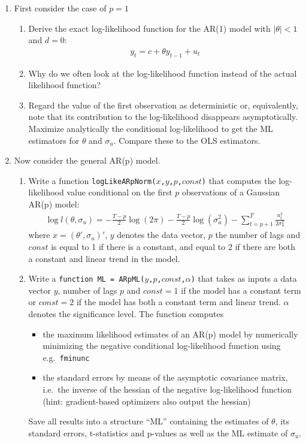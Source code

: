 \begin{enumerate}
\item
First consider the case of \(p=1\)
\begin{enumerate}
  \item Derive the exact log-likelihood function for the AR{(1)} model with \(|\theta|<1\) and \(d=0\):
  \begin{align*}
  y_t = c + \theta y_{t-1} + u_t
  \end{align*}
  \item Why do we often look at the log-likelihood function instead of the actual likelihood function?
  \item Regard the value of the first observation as deterministic or, equivalently,
    note that its contribution to the log-likelihood disappears asymptotically.
    Maximize analytically the conditional log-likelihood to get the ML estimators for \(\theta \) and \(\sigma_u\).
    Compare these to the OLS estimators.
\end{enumerate}
\item
Now consider the general AR{(p)} model.
\begin{enumerate}
  \item Write a function \texttt{logLikeARpNorm{(\(x\),\(y\),\(p\),\(const\))}}
    that computes the log-likelihood value
    conditional on the first \(p\) observations of a Gaussian AR{(p)} model:
  \begin{align*}
  \log l(\theta,\sigma_u)= -\frac{T-p}{2}\log(2\pi)-\frac{T-p}{2}\log(\sigma_u^2)-\sum_{t=p+1}^{T}\frac{u_t^2}{2\sigma_u^2}
  \end{align*}
  where \(x=(\theta',\sigma_u)'\), \(y\) denotes the data vector,
  \(p\) the number of lags and \(const\) is equal to 1 if there is a constant,
  and equal to 2 if there are both a constant and linear trend in the model.
  \item Write a \texttt{function ML = ARpML{(\(y\),\(p\),\(const\),\( \alpha \))}}
    that takes as inputs a data vector \(y\), number of lags \(p\)
    and \(const=1\) if the model has a constant term
    or \(const=2\) if the model has both a constant term and linear trend.
  \(\alpha \) denotes the significance level.
  The function computes 
  \begin{itemize}
    \item the maximum likelihood estimates of an AR{(p)} model
      by numerically minimizing the negative conditional log-likelihood function using e.g.\ \texttt{fminunc}
    \item the standard errors by means of the asymptotic covariance matrix, i.e.\
      the inverse of the hessian of the negative log-likelihood function
      (hint: gradient-based optimizers also output the hessian)
  \end{itemize}
  Save all results into a structure \enquote{ML} containing the estimates of \(\theta \),
    its standard errors, t-statistics and p-values as well as the ML estimate of \(\sigma_u\).
    

\end{enumerate}
\end{enumerate}
